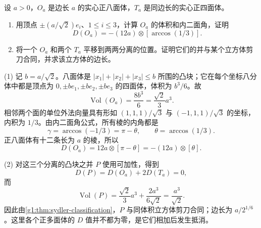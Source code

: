 \begin{exercise}
	\label{g1:ex:octahedron-tetrahedra-scissors}
	设 \(a>0\)，\(O_a\) 是边长 \(a\) 的实心正八面体，\(T_a\) 是同边长的实心正四面体。
	\begin{enumerate}
		\item 用顶点 \(\pm(a/\sqrt2)e_i\)、\(1\le i\le3\)，计算 \(O_a\) 的体积和内二面角，证明
		\[
			D(O_a)=-(12a)\otimes[\arccos(1/3)].
		\]
		\item 将一个 \(O_a\) 和两个 \(T_a\) 平移到两两分离的位置。证明它们的并与某个立方体剪刀合同，并求该立方体的边长。
	\end{enumerate}
\end{exercise}
\begin{solution}
	(1) 记 \(b=a/\sqrt2\)。八面体是 \(|x_1|+|x_2|+|x_3|\le b\) 所围的凸块；它在每个坐标八分体中都是顶点为 \(0,\pm be_1,\pm be_2,\pm be_3\) 的四面体，体积为 \(b^3/6\)。故
	\[
		\operatorname{Vol}(O_a)=\frac{8b^3}{6}
		=\frac{\sqrt2}{3}a^3.
	\]
	相邻两个面的单位外法向量具有形如 \((1,1,1)/\sqrt3\) 与 \((-1,1,1)/\sqrt3\) 的坐标，内积为 \(1/3\)。由内二面角公式，所有棱的内角都是
	\[
		\gamma=\arccos(-1/3)=\pi-\theta,
		\qquad \theta=\arccos(1/3).
	\]
	正八面体有十二条长为 \(a\) 的棱，所以
	\[
		D(O_a)=12a\otimes[\pi-\theta]
		=-(12a)\otimes[\theta].
	\]

	(2) 对这三个分离的凸块之并 \(P\) 使用可加性，得到
	\[
		D(P)=D(O_a)+2D(T_a)=0,
	\]
	而
	\[
		\operatorname{Vol}(P)
		=\frac{\sqrt2}{3}a^3+\frac{2a^3}{6\sqrt2}
		=\frac{a^3}{\sqrt2}.
	\]
	因此由\cref{g1:thm:sydler-classification}，\(P\) 与同体积立方体剪刀合同；边长为 \(a/2^{1/6}\)。这里各个正多面体的 \(D\) 值并不都为零，是它们相加后发生抵消。
\end{solution}
